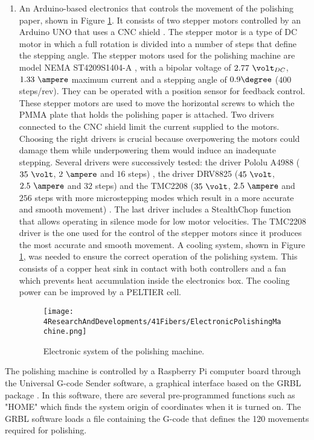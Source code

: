 \begin{enumerate}
\item{} An Arduino-based electronics that controls the movement of the polishing paper, shown in Figure \ref{fig:ElectronicSystemPolishingMachine}. It consists of two stepper motors controlled by an Arduino UNO \cite{ArduinoUNO} that uses a CNC shield \cite{CNCShield}. The stepper motor is a type of DC motor in which a full rotation is divided into a number of steps that define the stepping angle. The stepper motors used for the polishing machine are model NEMA ST4209S1404-A \cite{StepperMotors}, with a bipolar voltage of $2.77~\volt_{DC}$, $1.33~\ampere$ maximum current and a stepping angle of $0.9\degree$ ($400$ steps/rev). They can be operated with a position sensor for feedback control. These stepper motors are used to move the horizontal screws to which the PMMA plate that holds the polishing paper is attached. Two drivers connected to the CNC shield limit the current supplied to the motors. Choosing the right drivers is crucial because overpowering the motors could damage them while underpowering them would induce an inadequate stepping. Several drivers were successively tested: the driver Pololu A4988 ($35~\volt$, $2~\ampere$ and $16$ steps) \cite{A4988Driver}, the driver DRV8825 ($45~\volt$, $2.5~\ampere$ and $32$ steps) \cite{DRV8825Driver} and the TMC2208 ($35~\volt$, $2.5~\ampere$ and $256$ steps with more microstepping modes which result in a more accurate and smooth movement) \cite{TMC2208Driver}. The last driver includes a StealthChop function that allows operating in silence mode for low motor velocities. The TMC2208 driver is the one used for the control of the stepper motors since it produces the most accurate and smooth movement. A cooling system, shown in Figure \ref{fig:ElectronicSystemPolishingMachine}, was needed to ensure the correct operation of the polishing system. This consists of a copper heat sink in contact with both controllers and a fan which prevents heat accumulation inside the electronics box. The cooling power can be improved by a PELTIER cell.

\begin{figure}[h]
\centering
\texttt{[image: 4ResearchAndDevelopments/41Fibers/ElectronicPolishingMachine.png]}
\caption{Electronic system of the polishing machine.\label{fig:ElectronicSystemPolishingMachine}}
\end{figure}
\end{enumerate}

The polishing machine is controlled by a Raspberry Pi computer board \cite{RaspberryPi} through the Universal G-code Sender software, a graphical interface based on the GRBL package \cite{GRBLDocumentation}. In this software, there are several pre-programmed functions such as "HOME" which finds the system origin of coordinates when it is turned on. The GRBL software loads a file containing the G-code that defines the 120 movements required for polishing.

